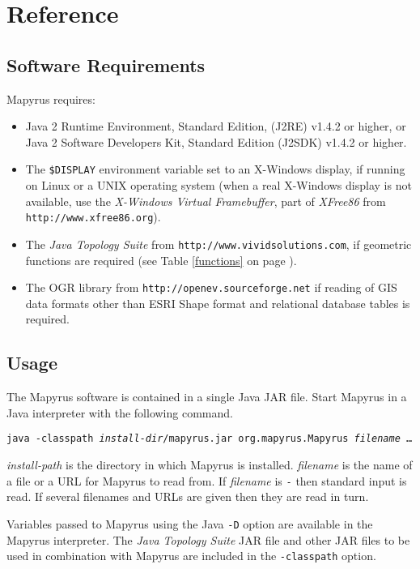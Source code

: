 
\section{Reference}

\subsection{Software Requirements}

Mapyrus requires:
\begin{itemize}
\item
Java 2 Runtime Environment, Standard Edition, (J2RE) v1.4.2 or higher,
or Java 2 Software Developers Kit, Standard Edition (J2SDK) v1.4.2 or higher.
\item
The \texttt{\$DISPLAY} environment variable set to an X-Windows display,
if running on Linux or a UNIX operating system (when a real X-Windows display
is not available, use the
\textit{X-Windows Virtual Framebuffer}, part of \textit{XFree86}
from
\texttt{http://www.xfree86.org}).
\item
The \textit{Java Topology Suite} from \texttt{http://www.vividsolutions.com},
if geometric functions are required
(see Table \ref{functions} on page \pageref{functions}).
\item
The OGR library from
\texttt{http://openev.sourceforge.net}
if reading of GIS data formats other than ESRI Shape format
and relational database tables is required.
\end{itemize}

\subsection{Usage}

The Mapyrus software is contained in a single Java JAR file.
Start Mapyrus in a Java interpreter with the following command.

\vspace{10pt}
\texttt{java -classpath \textit{install-dir}/mapyrus.jar org.mapyrus.Mapyrus \textit{filename} \dots}
\vspace{10pt}

\textit{install-path} is the directory in which
Mapyrus is installed.  \textit{filename} is the name of a file
or a URL for Mapyrus to read from.  If \textit{filename} is \texttt{-}
then standard input is read.  If several filenames and URLs are
given then they are read in turn.

Variables passed to Mapyrus using the Java \texttt{-D} option
are available in the Mapyrus interpreter.  The
\textit{Java Topology Suite} JAR file and other JAR files
to be used in combination with Mapyrus are included in the
\texttt{-classpath} option.

